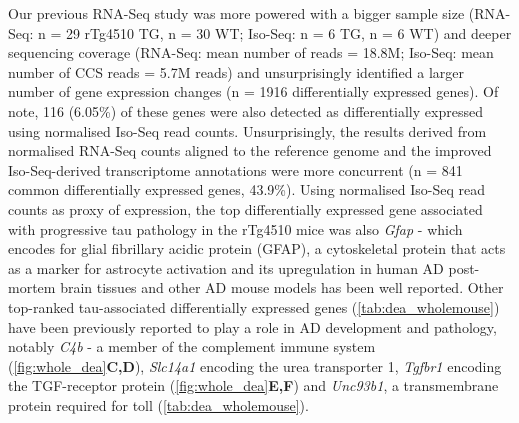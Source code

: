 Our previous RNA-Seq study\cite{Castanho2020} was more powered with a bigger sample size (RNA-Seq: n = 29 rTg4510 TG, n = 30 WT; Iso-Seq: n = 6 TG, n = 6 WT) and deeper sequencing coverage (RNA-Seq: mean number of reads = 18.8M; Iso-Seq: mean number of CCS reads = 5.7M reads) and unsurprisingly identified a larger number of gene expression changes (n = 1916 differentially expressed genes). Of note, 116 (6.05\%) of these genes were also detected as differentially expressed using normalised Iso-Seq read counts. Unsurprisingly, the results derived from normalised RNA-Seq counts aligned to the reference genome and the improved Iso-Seq-derived transcriptome annotations were more concurrent (n = 841 common differentially expressed genes, 43.9\%). Using normalised Iso-Seq read counts as proxy of expression, the top differentially expressed gene associated with progressive tau pathology in the rTg4510 mice was also \textit{Gfap} - which encodes for glial fibrillary acidic protein (GFAP), a cytoskeletal protein that acts as a marker for astrocyte activation and its upregulation in human AD post-mortem brain tissues and other AD mouse  models has been well reported\cite{Muramori1998,Ishiki2016, Chatterjee2021}. Other top-ranked tau-associated differentially expressed genes (\cref{tab:dea_wholemouse}) have been previously reported to play a role in AD development and pathology, notably \textit{C4b}\cite{Zorzetto2016} - a member of the complement immune system (\cref{fig:whole_dea}\textbf{C,D}), \textit{Slc14a1}\cite{Castillo2017} encoding the urea transporter 1, \textit{Tgfbr1} encoding the TGF-\textbeta receptor protein (\cref{fig:whole_dea}\textbf{E,F}) and \textit{Unc93b1}\cite{Wirz2013}, a transmembrane protein required for toll (\cref{tab:dea_wholemouse}). 

